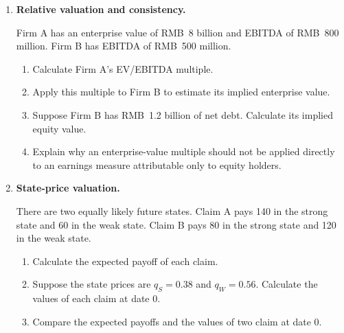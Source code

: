 \begin{enumerate}
\begin{enumerate}
\item Recalculate the terminal value if $g=4\%$, holding $r$ unchanged.

\item Recalculate the terminal value if $r=8\%$ and $g=3\%$.

\item Compare the results in parts (b) and (c). Explain why a one-percentage-point increase in $g$  and a one-percentage-point decrease in $r$ produce the same terminal value under the stated assumptions.

\end{enumerate}


\item \textbf{Relative valuation and consistency.}

Firm A has an enterprise value of RMB~8 billion and EBITDA of RMB~800 million. Firm B has EBITDA of RMB~500 million.

\begin{enumerate}

\item Calculate Firm A's EV/EBITDA multiple.

\item Apply this multiple to Firm B to estimate its implied enterprise value.

\item Suppose Firm B has RMB~1.2 billion of net debt. Calculate its implied equity value.

\item Explain why an enterprise-value multiple should not be applied directly to an earnings measure attributable only to equity holders.

\end{enumerate}


\item \textbf{State-price valuation.}

There are two equally likely future states. Claim A pays 140 in the strong state and 60 in the weak state. Claim B pays 80 in the strong state and 120 in the weak state.

\begin{enumerate}

\item Calculate the expected payoff of each claim.

\item Suppose the state prices are $q_S=0.38$ and $q_W=0.56$. Calculate the  values of each claim at date 0.

\item Compare the expected payoffs and the values of two claim at date 0.


\end{enumerate}
\end{enumerate}
